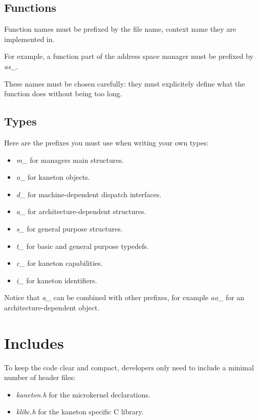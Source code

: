 %
%

\subsection{Functions}

Function names must be prefixed by the file name, context name they are
implemented in.

For example, a function part of the address space manager must be prefixed
by \textit{as\_}.

These names must be chosen carefully: they must explicitely define
what the function does without being too long.

%
%

\subsection{Types}

Here are the prefixes you must use when writing your own types:

\begin{itemize}
  \item
    \textit{m\_} for managers main structures.
  \item
    \textit{o\_} for kaneton objects.
  \item
    \textit{d\_} for machine-dependent dispatch interfaces.
  \item
    \textit{a\_} for architecture-dependent structures.
  \item
    \textit{s\_} for general purpose structures.
  \item
    \textit{t\_} for basic and general purpose typedefs.
  \item
    \textit{c\_} for kaneton capabilities.
  \item
    \textit{i\_} for kaneton identifiers.
\end{itemize}

Notice that \textit{a\_} can be combined with other prefixes, for
example \textit{ao\_} for an architecture-dependent object.

%
%

\section{Includes}

To keep the code clear and compact, developers only need to include a
minimal number of header files:

\begin{itemize}
  \item
    \textit{kaneton.h} for the microkernel declarations.
  \item
    \textit{klibc.h} for the kaneton specific C library.
\end{itemize}

